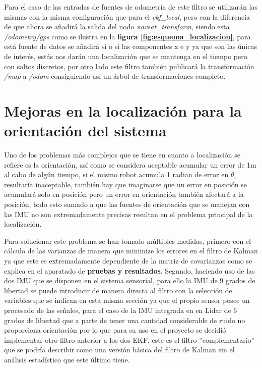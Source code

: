 Para el caso de las entradas de fuentes de odometría de este filtro se utilizarán las mismas con la misma configuración que para el 
\textit{ekf\_local}, pero con la diferencia de que ahora se añadirá la salida del nodo \textit{navsat\_transform}, siendo esta 
\textit{/odometry/gps} como se ilustra en la \textbf{figura \ref{fig:esquema_localizacion}}, para está fuente de datos se añadirá si o si las 
componentes x e y ya que son las únicas de interés,
 estás nos darán una localización que se mantenga en el tiempo pero con saltos discretos, por otro lado este filtro también publicará 
la transformación \textit{/map} a \textit{/odom} consiguiendo así un árbol de transformaciones completo.


\section{Mejoras en la localización para la orientación del sistema}

Uno de los problemas más complejos que se tiene en cuanto a localización se refiere es la orientación, así como se considera aceptable acumular un error de 1m al cabo de 
algún tiempo, si el mismo robot acumula 1 radian de error en \begin{math}\theta_{z}\end{math} resultaría inaceptable, también hay que imaginarse que un error en posición se acumulará solo en posición pero un error en orientación también 
afectará a la posición, todo esto sumado a que las fuentes de orientación que se manejan con las IMU no son extremadamente precisas resultan en el problema principal de la localización.

Para solucionar este problema se han tomado múltiples medidas, primero con el cálculo de las varianzas de manera que minimize los errores en el filtro de Kalman ya que este es extremadamente dependiente de la matriz de covarianzas como se explica en el aparatado 
de \textbf{pruebas y resultados}. Segundo, haciendo uso de las dos IMU que se disponen en el sistema sensorial, para ello la IMU de 9 grados de libertad se puede introducir de manera directa al filtro con la selección de variables que se indican en esta misma sección ya que el propio sensor posee un procesado de las señales, para el 
caso de la IMU integrada en en Lidar de 6 grados de libertad que a parte de tener una cantidad considerable de ruido no proporciona orientación por lo que para su uso en el proyecto se decidió 
implementar otro filtro anterior a los dos EKF, este es el filtro ''complementario'' que se podría describir como una versión básica del filtro de Kalman sin el análisis estadístico 
que este último tiene.

